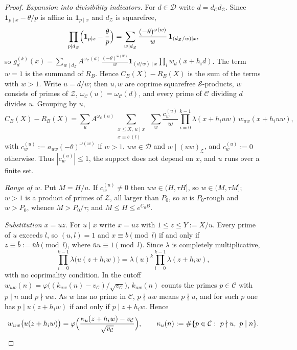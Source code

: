\documentclass[preprint,12pt]{elsarticle}
\numberwithin{equation}{section}
\theoremstyle{plain}
\theoremstyle{definition}
\theoremstyle{definition}
\theoremstyle{remark}
\begin{document}
\begin{proof}
\emph{Expansion into divisibility indicators.} For $d\in\mathcal D$ write $d=d_{\mathcal C}d_{\mathcal Z}$. Since $\mathbf 1_{p\mid x}-\theta/p$ is affine in $\mathbf 1_{p\mid x}$ and $d_{\mathcal Z}$ is squarefree,
\[
\prod_{p\mid d_{\mathcal Z}}\Bigl(\mathbf 1_{p\mid x}-\frac\theta p\Bigr)=\sum_{w\mid d_{\mathcal Z}}\frac{(-\theta)^{\omega(w)}}w\,\mathbf 1_{(d_{\mathcal Z}/w)\mid x},
\]
so $g^{(k)}_d(x)=\sum_{w\mid d_{\mathcal Z}}A^{\omega_{\mathcal C}(d)}\frac{(-\theta)^{\omega(w)}}w\mathbf 1_{(d/w)\mid x}\prod_iw_d(x+h_id)$. The term $w=1$ is the summand of $R_B$. Hence $C_B(X)-R_B(X)$ is the sum of the terms with $w>1$. Write $u=d/w$; then $u,w$ are coprime squarefree $\mathcal S$-products, $w$ consists of primes of $\mathcal Z$, $\omega_{\mathcal C}(u)=\omega_{\mathcal C}(d)$, and every prime of $\mathcal C$ dividing $d$ divides $u$. Grouping by $u$,
\[
C_B(X)-R_B(X)=\sum_{u}A^{\omega_{\mathcal C}(u)}\sum_{\substack{x\le X,\ u\mid x\\ x\equiv b\ (l)}}\ \sum_{w}\frac{c^{(u)}_w}w\prod_{i=0}^{k-1}\lambda(x+h_iuw)\,w_{uw}(x+h_iuw),
\]
with $c^{(u)}_w:=a_{uw}(-\theta)^{\omega(w)}$ if $w>1$, $uw\in\mathcal D$ and $w\mid(uw)_{\mathcal Z}$, and $c^{(u)}_w:=0$ otherwise. Thus $|c^{(u)}_w|\le1$, the support does not depend on $x$, and $u$ runs over a finite set.

\emph{Range of $w$.} Put $M=H/u$. If $c^{(u)}_w\ne0$ then $uw\in(H,\tau H]$, so $w\in(M,\tau M]$; $w>1$ is a product of primes of $\mathcal Z$, all larger than $P_0$, so $w$ is $P_0$-rough and $w>P_0$, whence $M>P_0/\tau$; and $M\le H\le e^{C_0B}$.

\emph{Substitution $x=uz$.} For $u\mid x$ write $x=uz$ with $1\le z\le Y:=X/u$. Every prime of $u$ exceeds $l$, so $(u,l)=1$ and $x\equiv b\pmod l$ if and only if $z\equiv\bar b:=\bar ub\pmod l$, where $\bar uu\equiv1\pmod l$. Since $\lambda$ is completely multiplicative,
\[
\prod_{i=0}^{k-1}\lambda\bigl(u(z+h_iw)\bigr)=\lambda(u)^k\prod_{i=0}^{k-1}\lambda(z+h_iw),
\]
with no coprimality condition. In the cutoff $w_{uw}(n)=\varphi\bigl((k_{uw}(n)-v_{\mathcal C})/\sqrt{v_{\mathcal C}}\bigr)$, $k_{uw}(n)$ counts the primes $p\in\mathcal C$ with $p\mid n$ and $p\nmid uw$. As $w$ has no prime in $\mathcal C$, $p\nmid uw$ means $p\nmid u$, and for such $p$ one has $p\mid u(z+h_iw)$ if and only if $p\mid z+h_iw$. Hence
\[
w_{uw}\bigl(u(z+h_iw)\bigr)=\varphi\Bigl(\frac{\kappa_u(z+h_iw)-v_{\mathcal C}}{\sqrt{v_{\mathcal C}}}\Bigr),\qquad \kappa_u(n):=\#\{p\in\mathcal C:\ p\nmid u,\ p\mid n\}.
\]


\end{proof}
\end{document}
